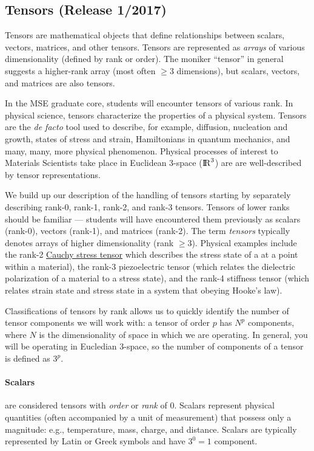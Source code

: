 \subsection{Tensors \hfill(Release 1/2017)}\label{subsec:Tensors}

Tensors are mathematical objects that define relationships between scalars, vectors, matrices, and other tensors. Tensors are represented as \textit{arrays} of various dimensionality (defined by rank or order). The moniker ``tensor'' in general suggests a higher-rank array (most often $\geq$3 dimensions), but scalars, vectors, and matrices are also tensors.

In the MSE graduate core, students will encounter tensors of various rank. In physical science, tensors characterize the properties of a physical system. Tensors are the \textit{de facto} tool used to describe, for example, diffusion, nucleation and growth, states of stress and strain, Hamiltonians in quantum mechanics, and many, many, more physical phenomenon. Physical processes of interest to Materials Scientists take place in Euclidean 3-space (${\rm I\!R}^3$) are are well-described by tensor representations.

We build up our description of the handling of tensors starting by separately describing rank-0, rank-1, rank-2, and rank-3 tensors. Tensors of lower ranks should be familiar --- students will have encountered them previously as scalars (rank-0), vectors (rank-1), and matrices (rank-2). The term \emph{tensors} typically denotes arrays of higher dimensionality (rank $\geq3$). Physical examples include the rank-2 \href{https://en.wikipedia.org/wiki/Cauchy_stress_tensor}{Cauchy stress tensor} which describes the stress state of a at a point within a material), the rank-3 piezoelectric tensor (which relates the dielectric polarization of a material to a stress state), and the rank-4 stiffness tensor (which relates strain state and stress state in a system that obeying Hooke's law).

Classifications of tensors by  rank allows us to quickly identify the number of tensor components we will work with: a tensor of order $p$ has $N^p$ components, where $N$ is the dimensionality of space in which we are operating. In general, you will be operating in Eucledian 3-space, so the number of components of a tensor is defined as $3^p$. 

\paragraph{Scalars}are considered tensors with \emph{order} or \emph{rank} of 0. Scalars represent physical quantities (often accompanied by a unit of measurement) that possess only a magnitude: e.g., temperature, mass, charge, and distance. Scalars are typically represented by Latin or Greek symbols and have $3^{0} = 1$ component.

